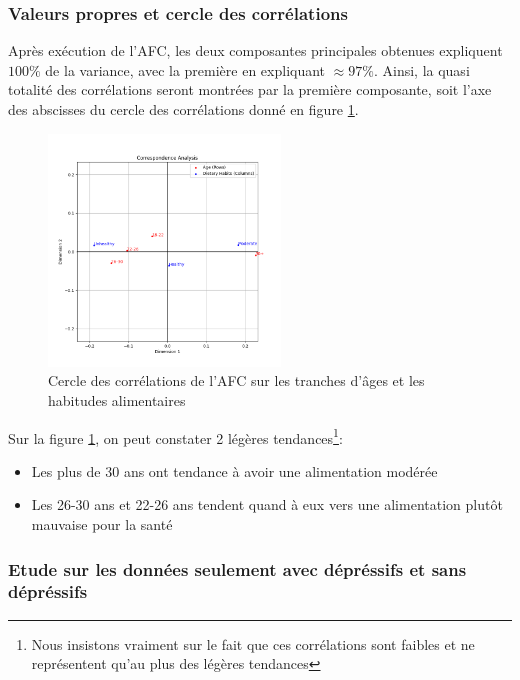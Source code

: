 \subsubsection{Valeurs propres et cercle des corrélations}

Après exécution de l'AFC, les deux composantes principales obtenues expliquent $100\%$ de la variance, avec la première en expliquant $\approx 97\%$.
Ainsi, la quasi totalité des corrélations seront montrées par la première composante, soit l'axe des abscisses du cercle des corrélations donné en figure \ref{fig:corrAgeDietary}.

\begin{figure}[!h]
  \begin{center}
    \includegraphics[width=0.55\textwidth]{Images/Age_Dietary_all/Corr_circle.png}
  \end{center}
  \caption{Cercle des corrélations de l'AFC sur les tranches d'âges et les habitudes alimentaires}
  \label{fig:corrAgeDietary}
\end{figure}

Sur la figure \ref{fig:corrAgeDietary}, on peut constater 2 légères tendances\footnote{Nous insistons vraiment sur le fait que ces corrélations sont faibles et ne représentent qu'au plus des légères tendances}:
\begin{itemize}
  \item Les plus de 30 ans ont tendance à avoir une alimentation modérée 
  \item Les 26-30 ans et 22-26 ans tendent quand à eux vers une alimentation plutôt mauvaise pour la santé
\end{itemize}

\subsubsection{Etude sur les données seulement avec dépréssifs et sans dépréssifs}

